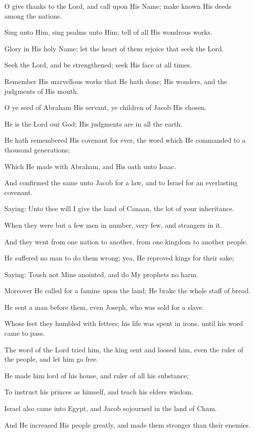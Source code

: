 O give thanks to the Lord, and call upon His Name; make known His deeds among the nations.

Sing unto Him, sing psalms unto Him; tell of all His wondrous works.

Glory in His holy Name; let the heart of them rejoice that seek the Lord.

Seek the Lord, and be strengthened; seek His face at all times.

Remember His marvellous works that He hath done; His wonders, and the judgments of His mouth.

O ye seed of Abraham His servant, ye children of Jacob His chosen.

He is the Lord our God; His judgments are in all the earth.

He hath remembered His covenant for ever, the word which He commanded to a thousand generations;

Which He made with Abraham, and His oath unto Isaac.

And confirmed the same unto Jacob for a law, and to Israel for an everlasting covenant.

Saying: Unto thee will I give the land of Canaan, the lot of your inheritance.

When they were but a few men in number, very few, and strangers in it.

And they went from one nation to another, from one kingdom to another people.

He suffered no man to do them wrong; yea, He reproved kings for their sake;

Saying: Touch not Mine anointed, and do My prophets no harm.

Moreover He called for a famine upon the land; He brake the whole staff of bread.

He sent a man before them, even Joseph, who was sold for a slave.

Whose feet they humbled with fetters; his life was spent in irons, until his word came to pass.

The word of the Lord tried him, the king sent and loosed him, even the ruler of the people, and let him go free.

He made him lord of his house, and ruler of all his substance;

To instruct his princes as himself, and teach his elders wisdom.

Israel also came into Egypt, and Jacob sojourned in the land of Cham.

And He increased His people greatly, and made them stronger than their enemies.

